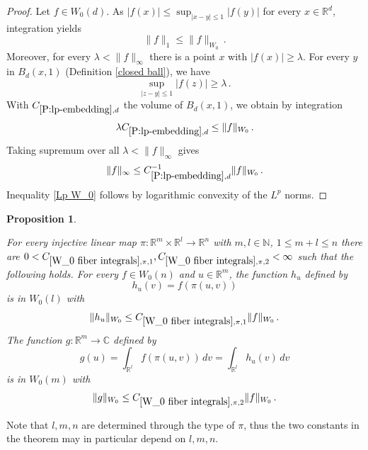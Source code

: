 \documentclass[12pt,reqno]{amsart}
\theoremstyle{plain}
\newtheorem{proposition}[theorem]{Proposition}
\numberwithin{equation}{section}
\theoremstyle{remark}
\newcommand{\uses}[1]{}
\newcommand{\usesdefs}[1]{}
\newcommand{\leanok}{}
\newcommand{\lean}[1]{}
\newcommand{\R}{{\mathbb R}}
\newcommand{\Rm}{{\mathbb R}^m}
\newcommand{\N}{{\mathbb N}}
\newcommand{\C}{{\mathbb C}}
\begin{document}
\begin{proof}
Let $f\in W_0(d)$. As $|f(x)|\le \sup_{|x-y|\le 1}|f(y)|$ for every $x\in \R^d$, integration yields
\begin{equation}
    \|f\|_1\le \|f\|_{W_0}\, .
\end{equation}
Moreover, for every $\lambda<\|f\|_\infty$  there is a point $x$ with $|f(x)|\ge \lambda$.
For every $y$ in  $B_d(x,1)$ (Definition \ref{closed ball}), we have
\begin{equation*}
    \sup_{|z-y|\le 1}
|f(z)|\ge \lambda \, .\end{equation*}
With $C_{\ref{P:lp-embedding},d}$  the volume of  $B_d(x,1)$, we obtain by integration
\begin{equation}
    \lambda C_{\ref{P:lp-embedding},d}\le \|f\|_{W_0}\, .
\end{equation}
Taking supremum over all $\lambda<
\|f\|_\infty$ gives
\begin{equation}
    \|f\|_\infty\le C_{\ref{P:lp-embedding},d}^{-1}\|f\|_{W_0}\, .
\end{equation}
Inequality \eqref{Lp W_0} follows by logarithmic convexity of the $L^p$ norms.
\end{proof}


\begin{proposition}\label{W_0 fiber integrals}\uses{P:lp-embedding,W_0 radius independence,auto:local-supremum-measurability}\usesdefs{auto:Wiener-space-definition}
\lean{Auto.exists_wienerEnvelope_fiber_and_integral_comp_injective_continuousLinearMap_bound}
\leanok
For every injective linear map $\pi:\R^{m}\times \R^{l}\to \R^n$ with $m,l\in\N$, $1\le m+l\le n$
there are $0<C_{\ref{W_0 fiber integrals},\pi,1},C_{\ref{W_0 fiber integrals},\pi,2}<\infty$ such that the following holds. For every $f\in W_0(n)$ and $u\in\R^m$, the function $h_u$ defined by
\begin{equation}\label{auto:Wiener-fiber-function}
    h_u(v)=f(\pi(u,v))
\end{equation}
is in $W_0(l)$ with
\begin{equation}\label{W_0 on fiber}
    \|h_u\|_{W_0}\le C_{\ref{W_0 fiber integrals},\pi,1} \|f\|_{W_0}\, .
\end{equation}
The function $g:\Rm\to \C$ defined by
\begin{equation}\label{auto:Wiener-fiber-integral} g(u) = \int_{\R^l} f(\pi(u,v)) \,dv= \int_{\R^l} h_u(v) \,dv \end{equation}
is in $W_0(m)$ with
\begin{equation}\label{W_0 across fibers}
    \|g\|_{W_0}\le C_{\ref{W_0 fiber integrals},\pi,2}  \|f\|_{W_0}\, .
\end{equation}
\end{proposition}
 Note that $l,m,n$ are determined through the type of $\pi$, thus the two constants in the theorem
 may in particular depend on $l,m,n$.
\end{document}
